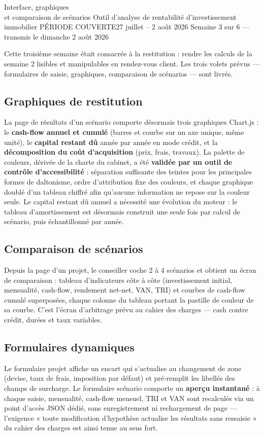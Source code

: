 \documentclass[11pt,a4paper]{article}
\begin{document}
	{Interface, graphiques \\ et comparaison de scénarios}
	{Outil d'analyse de rentabilité d'investissement immobilier}
	{PÉRIODE COUVERTE}{27 juillet -- 2 août 2026}
	{Semaine 3 sur 6 — transmis le dimanche 2 août 2026}


Cette troisième semaine était consacrée à la restitution : rendre les calculs de la semaine 2 lisibles et manipulables en rendez-vous client. Les trois volets prévus — formulaires de saisie, graphiques, comparaison de scénarios — sont livrés.

\subsection{Graphiques de restitution}
La page de résultats d'un scénario comporte désormais trois graphiques Chart.js : le \textbf{cash-flow annuel et cumulé} (barres et courbe sur un axe unique, même unité), le \textbf{capital restant dû} année par année en mode crédit, et la \textbf{décomposition du coût d'acquisition} (prix, frais, travaux). La palette de couleurs, dérivée de la charte du cabinet, a été \textbf{validée par un outil de contrôle d'accessibilité} : séparation suffisante des teintes pour les principales formes de daltonisme, ordre d'attribution fixe des couleurs, et chaque graphique doublé d'un tableau chiffré afin qu'aucune information ne repose sur la couleur seule. Le capital restant dû annuel a nécessité une évolution du moteur : le tableau d'amortissement est désormais construit une seule fois par calcul de scénario, puis échantillonné par année.

\subsection{Comparaison de scénarios}
Depuis la page d'un projet, le conseiller coche 2 à 4 scénarios et obtient un écran de comparaison : tableau d'indicateurs côte à côte (investissement initial, mensualité, cash-flow, rendement net-net, VAN, TRI) et courbes de cash-flow cumulé superposées, chaque colonne du tableau portant la pastille de couleur de sa courbe. C'est l'écran d'arbitrage prévu au cahier des charges — cash contre crédit, durées et taux variables.

\subsection{Formulaires dynamiques}
Le formulaire projet affiche un encart qui s'actualise au changement de zone (devise, taux de frais, imposition par défaut) et pré-remplit les libellés des champs de surcharge. Le formulaire scénario comporte un \textbf{aperçu instantané} : à chaque saisie, mensualité, cash-flow mensuel, TRI et VAN sont recalculés via un point d'accès JSON dédié, sans enregistrement ni rechargement de page — l'exigence « toute modification d'hypothèse actualise les résultats sans ressaisie » du cahier des charges est ainsi tenue au sens fort.
\end{document}

